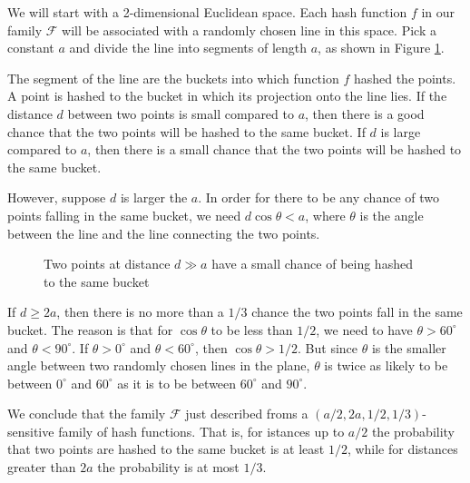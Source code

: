We will start with a 2-dimensional Euclidean space. Each hash function $f$ in our family $\boldsymbol{\mathcal{F}}$ will be associated with a randomly chosen line in this space. Pick a constant $a$ and divide the line into segments of length $a$, as shown in Figure \ref{fig:4-two-points-and-buckets}.       

The segment of the line are the buckets into which function $f$ hashed the points. A point is hashed to the bucket in which its projection onto the line lies. If the distance $d$ between two points is small compared to $a$, then there is a good chance that the two points will be hashed to the same bucket. If $d$ is large compared to $a$, then there is a small chance that the two points will be hashed to the same bucket.

However, suppose $d$ is larger the $a$. In order for there to be any chance of two points falling in the same bucket, we need $d\cos{\theta} < a$, where $\theta$ is the angle between the line and the line connecting the two points.

\begin{figure}[H]
\centering
\scalebox{1}{
    
}
\caption{Two points at distance $d \gg a$ have a small chance of being hashed to the same bucket}
\label{fig:4-two-points-and-buckets}
\end{figure}

If $d \geq 2a$, then there is no more than a $1/3$ chance the two points fall in the same bucket. The reason is that for $\cos{\theta}$ to be less than $1/2$, we need to have $\theta > 60^{\circ}$ and $\theta < 90^{\circ}$. If $\theta > 0^{\circ}$ and $\theta < 60^{\circ}$, then $\cos{\theta} > 1/2$. But since $\theta$ is the smaller angle between two randomly chosen lines in the plane, $\theta$ is twice as likely to be between $0^{\circ}$ and $60^{\circ}$ as it is to be between $60^{\circ}$ and $90^{\circ}$.

We conclude that the family $\boldsymbol{\mathcal{F}}$ just described froms a $(a/2, 2a, 1/2, 1/3)$-sensitive family of hash functions. That is, for istances up to $a/2$ the probability that two points are hashed to the same bucket is at least $1/2$, while for distances greater than $2a$ the probability is at most $1/3$.

